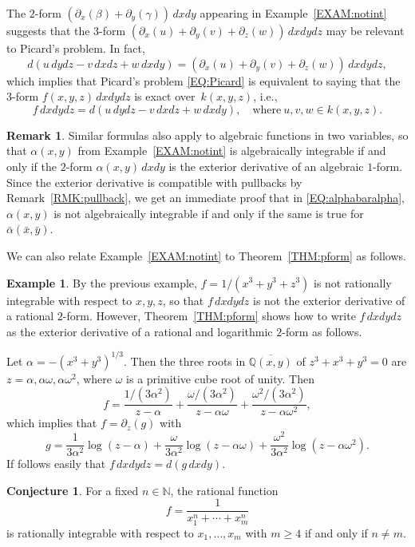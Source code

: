 \documentclass{amsart}
\theoremstyle{definition}
\newtheorem{remark}[thm]{Remark}
\newtheorem{example}[thm]{Example}
\newtheorem{conj}[thm]{Conjecture}
\def\QX{{\mathbb Q}}
\numberwithin{equation}{section}
\numberwithin{thm}{section}
\begin{document}
The $2$-form $(\partial_x(\beta) + \partial_y(\gamma))\,dxdy$ appearing in Example~\ref{EXAM:notint} suggests that the $3$-form $(\partial_x(u) + \partial_y(v) +\partial_z(w))\,dxdydz$ may be relevant to Picard's problem.  In fact,
\[
d(u \,dy  dz - v \,dx  dz + w \,dx dy) = (\partial_x(u) + \partial_y(v) +\partial_z(w))\,dxdydz,
\]
which implies that Picard's problem \eqref{EQ:Picard} is equivalent to saying that the $3$-form $f(x, y, z)\, dx dy  dz$ is exact over~$k(x,y,z)$, i.e.,
\[
f \,dx dy  dz = d(u \,dy  dz - v \,dx  dz + w \,dx dy),\quad\text{where}\ u,v,w \in k(x,y,z).
\]

\begin{remark}\label{RMK:algebraicallyexact}
Similar formulas also apply to algebraic functions in two variables, so that $\alpha(x,y)$ from
Example~\ref{EXAM:notint} is algebraically integrable if and only if the $2$-form $\alpha(x,y)\,dxdy$ is the exterior derivative of an algebraic $1$-form.  Since the exterior derivative is compatible with pullbacks by Remark~\ref{RMK:pullback}, we get an immediate proof that in \eqref{EQ:alphabaralpha}, $\alpha(x,y)$ is not  algebraically integrable if and only if the same is true for $\bar\alpha(\bar x,\bar y)$.
\end{remark}

We can also relate Example~\ref{EXAM:notint} to Theorem~\ref{THM:pform} as follows.

\begin{example}
\label{EXAM:3Form}
By the previous example, $f = 1/(x^3 + y^3 + z^3)$ is not  rationally integrable with respect to $x, y, z$, so that $f\, dxdydz$ is not the exterior derivative of a rational $2$-form.  However, Theorem~\ref{THM:pform} shows how to write $f\, dxdydz$ as  the exterior derivative of a rational and logarithmic $2$-form as follows.

Let $\alpha = -(x^3 + y^3)^{1/3}$. Then the three roots in $\overline{\QX(x, y)}$ of $z^3 + x^3 + y^3 = 0$ are $z = \alpha, \alpha \omega, \alpha \omega^2$, where $\omega$ is a primitive cube root of unity. Then
\[
f = \frac{1/(3\alpha^2)}{z-\alpha} +  \frac{\omega/(3\alpha^2)}{z-\alpha\omega} + \frac{\omega^2/(3\alpha^2)}{z-\alpha\omega^2},
\]
which implies that $f = \partial_z(g)$ with
\[
g = \frac{1}{3\alpha^2}\log(z-\alpha) + \frac{\omega}{3\alpha^2}\log(z-\alpha\omega) + \frac{\omega^2}{3\alpha^2}\log(z-\alpha\omega^2) .
\]
If follows easily that $f \,dx  dy dz = d(g\, dx  dy)$.
\end{example}

\begin{conj}
\label{CONJ:WhenRatInt}
For a fixed $n \in \mathbb{N}$, the rational function
\[f = \frac{1}{x_1^n+\cdots+x_m^n} \]
is rationally integrable with respect to $x_1,\ldots,x_m$ with $m \geq 4$ if and only if $n \neq m$.
\end{conj}
\end{document}
